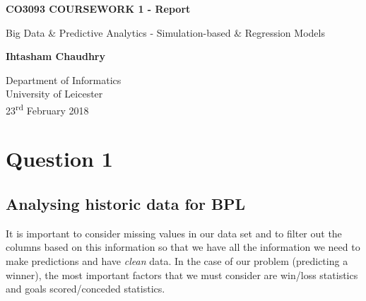 \documentclass[11pt]{report}
\newcommand{\ts}{\textsuperscript}
\begin{document}
\begin{titlepage}
    \begin{center}
        \vspace*{1cm}
        
        \textbf{CO3093 COURSEWORK 1 - Report}
        
        \vspace{0.5cm}
		Big Data \& Predictive Analytics - Simulation-based \& Regression Models
        
        \vspace{1.5cm}
        
        \textbf{Ihtasham Chaudhry}
        
        \vfill
        
        \vspace{0.8cm}
                
        Department of Informatics\\
        University of Leicester\\
        23\ts{rd} February 2018
        
    \end{center}
\end{titlepage}

\newpage

\section{Question 1}

\vspace{0.5cm}

\subsection{Analysing historic data for BPL}

\vspace{0.5cm}

It is important to consider missing values in our data set and to filter out the columns based on this information so that we have all the information we need to make predictions and have \emph{clean} data. In the case of our problem (predicting a winner), the most important factors that we must consider are win/loss statistics and goals scored/conceded statistics.
\end{document}
